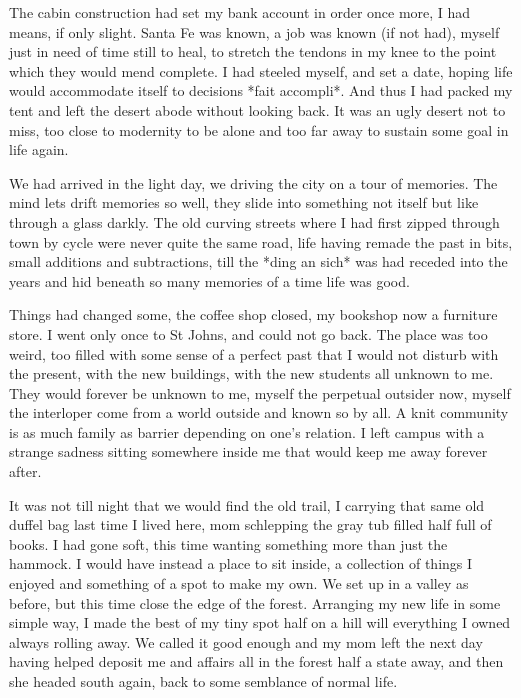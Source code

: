 \documentclass[ebook, 10pt, openright, onecolumn]{memoir}
\begin{document}
The cabin construction had set my bank account in order once more, I had means,
if only slight.  Santa Fe was known, a job was known (if not had), myself just
in need of time still to heal, to stretch the tendons in my knee to the point
which they would mend complete. I had steeled myself, and set a date, hoping
life would accommodate itself to decisions *fait accompli*.  And thus I had
packed my tent and left the desert abode without looking back.  It was an ugly
desert not to miss, too close to modernity to be alone and too far away to
sustain some goal in life again.

We had arrived in the light day, we driving the city on a tour of memories.  The
mind lets drift memories so well, they slide into something not itself but like
through a glass darkly.  The old curving streets where I had first zipped
through town by cycle were never quite the same road, life having remade the
past in bits, small additions and subtractions, till the *ding an sich* was had
receded into the years and hid beneath so many memories of a time life was good.

Things had changed some, the coffee shop closed, my bookshop now a furniture
store. I went only once to St Johns, and could not go back.  The place was too
weird, too filled with some sense of a perfect past that I would not disturb
with the present, with the new buildings, with the new students all unknown to
me.  They would forever be unknown to me, myself the perpetual outsider now,
myself the interloper come from a world outside and known so by all.  A knit
community is as much family as barrier depending on one's relation.  I left
campus with a strange sadness sitting somewhere inside me that would keep me
away forever after.

It was not till night that we would find the old trail, I carrying that same old
duffel bag last time I lived here, mom schlepping the gray tub filled half full
of books.  I had gone soft, this time wanting something more than just the
hammock.  I would have instead a place to sit inside, a collection of things I
enjoyed and something of a spot to make my own.  We set up in a valley as
before, but this time close the edge of the forest.  Arranging my new life in
some simple way, I made the best of my tiny spot half on a hill will everything
I owned always rolling away.  We called it good enough and my mom left the next
day having helped deposit me and affairs all in the forest half a state away,
and then she headed south again, back to some semblance of normal life.  
\end{document}
